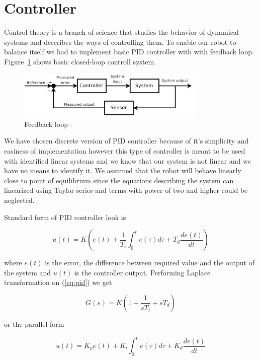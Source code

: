 \documentclass{article}
\begin{document}
\section{Controller}

Control theory is a branch of science that studies the behavior of dynamical
systems and describes the ways of controlling them. To enable our robot to
balance itself we had to implement basic PID controller with with feedback loop.
Figure~\ref{fig:loop} shows basic closed-loop controll system.

\begin{figure}[h]
    \centering
    \includegraphics[width=9cm]{loop}
    \caption{Feedback loop \cite{wloop}}
    \label{fig:loop}
\end{figure}

We have chosen discrete version of PID controller because of it's simplicity and
easiness of implementation however this type of controller is meant to be used
with identified linear systems and we know that our system is not linear and we
have no means to identify it. We assumed that the robot will behave linearly
close to point of equilibrium since the equations describing the system can
linearized using Taylor series and terms with power of two and higher could be
neglected.

Standard form of PID controller look is

\begin{equation} \label{eq:pid}
    u(t) = K \left( e(t) + \frac{1}{T_i} \int_0^t e(\tau)d\tau + T_d
        \frac{de(t)}{dt} \right)
\end{equation}

\noindent where $e(t)$ is the error, the difference between required value and the output
of the system and $u(t)$ is the controller output. Performing Laplace
transformation on (\ref{eq:pid}) we get

\begin{equation}
    G(s) = K \left( 1 + \frac{1}{sT_i} + sT_d \right)
\end{equation}

\noindent or the parallel form

\begin{equation} \label{eq:pid}
    u(t) =  K_pe(t) + K_i \int_0^t e(\tau)d\tau + K_d
        \frac{de(t)}{dt}\end{equation}
\end{document}
